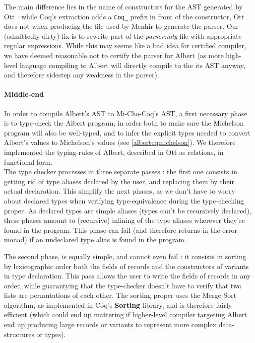 \documentclass{report}
\begin{document}
The main difference lies in the name of constructors for the AST generated by Ott : while Coq's extraction adds a \texttt{Coq\_} prefix in front of the constructor, Ott does not when producing the  file used by Menhir to generate the parser. Our (admittedly dirty) fix is to rewrite part of the \textit{parser.mly} file with appropriate regular expressions. While this may seems like a bad idea for certified compiler, we have deemed reasonable not to certify the parser for Albert (as more high-level language compiling to Albert will directly compile to the its AST anyway, and therefore sidestep any weakness in the parser).

\paragraph{Middle-end}

In order to compile Albert's AST to Mi-Cho-Coq's AST, a first necessary phase is to type-check the Albert program, in order both to make sure the Michelson program will also be well-typed, and to infer the explicit types needed to convert Albert's values to Michelson's values (see \ref{alberteqmichelson}). We therefore implemented the typing-rules of Albert, described in Ott as relations, in functional form.\\

The type checker processes in three separate passes : the first one consists in getting rid of type aliases declared by the user, and replacing them by their actual declaration. This simplify the next phases, as we don't have to worry about declared types when verifying type-equivalence during the type-checking proper. As declared types are simple aliases (types can't be recursively declared), these phases amount to (recursive) inlining of the type aliases wherever they're found in the program. This phase can fail (and therefore returns in the error monad) if an undeclared type alias is found in the program. 

The second phase, is equally simple, and cannot even fail : it consists in sorting by lexicographic order both the fields of records and the constructors of variants in type declaration. This pass allows the user to write the fields of records in any order, while guarantying that the type-checker doesn't have to verify that two lists are permutations of each other. The sorting proper uses the Merge Sort algorithm, as implemented in Coq's \textbf{Sorting} library, and is therefore fairly efficient (which could end up mattering if higher-level compiler targeting Albert end up producing large records or variants to represent more complex data-structures or types).\\
\end{document}
